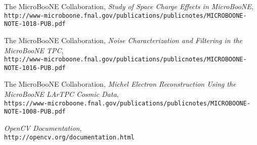 \documentclass[12pt]{article}
\begin{document}
\begin{thebibliography}{20}
  The MicroBooNE Collaboration, \emph{Study of Space Charge Effects in MicroBooNE},\\
  \texttt{http://www-microboone.fnal.gov/publications/publicnotes/MICROBOONE-NOTE-1018-PUB.pdf}

  The MicroBooNE Collaboration, \emph{Noise Characterization and Filtering in the MicroBooNE TPC},\\
  \texttt{http://www-microboone.fnal.gov/publications/publicnotes/MICROBOONE-NOTE-1016-PUB.pdf}

  The MicroBooNE Collaboration, \emph{Michel Electron Reconstruction Using the MicroBooNE LArTPC Cosmic Data},\\
  \texttt{https://www-microboone.fnal.gov/publications/publicnotes/MICROBOONE-NOTE-1008-PUB.pdf}

  \emph{OpenCV Documentation},\\
  \texttt{http://opencv.org/documentation.html}


\end{thebibliography}
\end{document}
